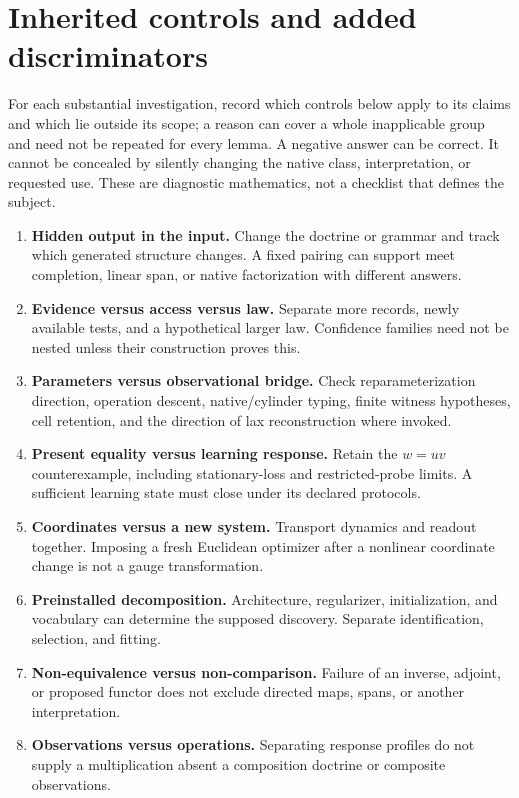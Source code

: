 \documentclass[11pt]{article}
\theoremstyle{definition}
\begin{document}
\section{Inherited controls and added discriminators}
\label{app:controls}

For each substantial investigation, record which controls below apply to its claims and which lie outside its scope; a reason can cover a whole inapplicable group and need not be repeated for every lemma. A negative answer can be correct. It cannot be concealed by silently changing the native class, interpretation, or requested use. These are diagnostic mathematics, not a checklist that defines the subject.

\begin{enumerate}
\item \textbf{Hidden output in the input.} Change the doctrine or grammar and track which generated structure changes. A fixed pairing can support meet completion, linear span, or native factorization with different answers.
\item \textbf{Evidence versus access versus law.} Separate more records, newly available tests, and a hypothetical larger law. Confidence families need not be nested unless their construction proves this.
\item \textbf{Parameters versus observational bridge.} Check reparameterization direction, operation descent, native/cylinder typing, finite witness hypotheses, cell retention, and the direction of lax reconstruction where invoked.
\item \textbf{Present equality versus learning response.} Retain the $w=uv$ counterexample, including stationary-loss and restricted-probe limits. A sufficient learning state must close under its declared protocols.
\item \textbf{Coordinates versus a new system.} Transport dynamics and readout together. Imposing a fresh Euclidean optimizer after a nonlinear coordinate change is not a gauge transformation.
\item \textbf{Preinstalled decomposition.} Architecture, regularizer, initialization, and vocabulary can determine the supposed discovery. Separate identification, selection, and fitting.
\item \textbf{Non-equivalence versus non-comparison.} Failure of an inverse, adjoint, or proposed functor does not exclude directed maps, spans, or another interpretation.
\item \textbf{Observations versus operations.} Separating response profiles do not supply a multiplication absent a composition doctrine or composite observations.

\end{enumerate}
\end{document}
